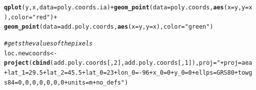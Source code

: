 \documentclass{article}\usepackage[]{graphicx}\usepackage[]{color}
\makeatletter
\newcommand{\hlnum}[1]{\textcolor[rgb]{0.686,0.059,0.569}{#1}}%
\newcommand{\hlstr}[1]{\textcolor[rgb]{0.192,0.494,0.8}{#1}}%
\newcommand{\hlcom}[1]{\textcolor[rgb]{0.678,0.584,0.686}{\textit{#1}}}%
\newcommand{\hlopt}[1]{\textcolor[rgb]{0,0,0}{#1}}%
\newcommand{\hlstd}[1]{\textcolor[rgb]{0.345,0.345,0.345}{#1}}%
\newcommand{\hlkwb}[1]{\textcolor[rgb]{0.69,0.353,0.396}{#1}}%
\newcommand{\hlkwc}[1]{\textcolor[rgb]{0.333,0.667,0.333}{#1}}%
\newcommand{\hlkwd}[1]{\textcolor[rgb]{0.737,0.353,0.396}{\textbf{#1}}}%
\newenvironment{kframe}{%
 \def\at@end@of@kframe{}%
 \ifinner\ifhmode%
  \def\at@end@of@kframe{\end{minipage}}%
  \begin{minipage}{\columnwidth}%
 \fi\fi%
 \def\FrameCommand##1{\hskip\@totalleftmargin \hskip-\fboxsep
 \colorbox{shadecolor}{##1}\hskip-\fboxsep
     \hskip-\linewidth \hskip-\@totalleftmargin \hskip\columnwidth}%
 \MakeFramed {\advance\hsize-\width
   \@totalleftmargin\z@ \linewidth\hsize
   \@setminipage}}%
 {\par\unskip\endMakeFramed%
 \at@end@of@kframe}
\newenvironment{knitrout}{}{} %
\makeatother
\begin{document}
\begin{itemize}
\begin{knitrout}
\begin{kframe}
\begin{alltt}
\hlkwd{qplot}\hlstd{(y, x,} \hlkwc{data} \hlstd{= poly.coords.ia)} \hlopt{+} \hlkwd{geom_point}\hlstd{(}\hlkwc{data} \hlstd{= poly.coords,} \hlkwd{aes}\hlstd{(}\hlkwc{x} \hlstd{= y,} \hlkwc{y} \hlstd{= x),} \hlkwc{color} \hlstd{=} \hlstr{"red"}\hlstd{)} \hlopt{+}
    \hlkwd{geom_point}\hlstd{(}\hlkwc{data} \hlstd{= add.poly.coords,} \hlkwd{aes}\hlstd{(}\hlkwc{x} \hlstd{= y,} \hlkwc{y} \hlstd{= x),} \hlkwc{color} \hlstd{=} \hlstr{"green"}\hlstd{)}

\hlcom{# gets the values of the pixels}
\hlstd{loc.newcoords} \hlkwb{<-} \hlkwd{project}\hlstd{(}\hlkwd{cbind}\hlstd{(add.poly.coords[,} \hlnum{2}\hlstd{], add.poly.coords[,} \hlnum{1}\hlstd{]),} \hlkwc{proj} \hlstd{=} \hlstr{"+proj=aea +lat_1=29.5 +lat_2=45.5 +lat_0=23 +lon_0=-96 +x_0=0 +y_0=0 +ellps=GRS80 +towgs84=0,0,0,0,0,0,0 +units=m +no_defs"}\hlstd{)}
\end{alltt}
\end{kframe}


\end{knitrout}
\end{itemize}
\end{document}
